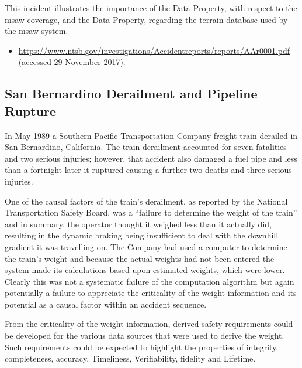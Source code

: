 This incident illustrates the importance of the Data Property, with respect to the \gls{msaw} coverage, and the  Data Property,
regarding
the terrain \gls{database} used by the \gls{msaw} system.

\begin{samepage}
\begin{itemize}
	\item \raggedright{\href{https://www.ntsb.gov/investigations/Accidentreports/reports/AAr0001.pdf}{https://www.ntsb.gov/investigations/Accidentreports/reports/AAr0001.pdf} (accessed 29 November 2017).}
\end{itemize}
\end{samepage}

\subsection{San Bernardino Derailment and Pipeline Rupture} \label{bkm:incacc:sanbernardino}
In May 1989 a Southern Pacific Transportation Company freight train derailed in San Bernardino, California. The train derailment accounted for seven fatalities and two serious injuries; however, that accident also damaged a fuel pipe and less than a fortnight later it ruptured causing a further two deaths and three serious injuries.

One of the causal factors of the train’s derailment, as reported by the National Transportation Safety Board, was a ``failure to determine the weight of the train'' and in summary, the operator thought it weighed less than it actually did, resulting in the dynamic braking being insufficient to deal with the downhill gradient it was travelling on. The Company had used a computer to determine the train’s weight and because the actual weights had not been entered the system made its calculations based upon estimated weights, which were lower. Clearly this was not a systematic failure of the computation algorithm but again potentially a failure to appreciate the \gls{criticality} of the weight \gls{information} and its potential as a causal factor within an accident sequence.

From the \gls{criticality} of the weight \gls{information}, derived safety requirements could be developed for the various data sources that were used to derive the weight. Such requirements could be expected to highlight the properties of \gls{integrity}, \gls{completeness}, \gls{accuracy}, Timeliness, Verifiability, \gls{fidelity} and Lifetime.

